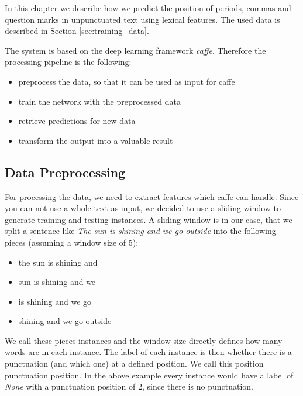 In this chapter we describe how we predict the position of periods, commas and question marks in unpunctuated text using lexical features.
The used data is described in Section \ref{sec:training_data}.


The system is based on the deep learning framework \emph{caffe}.
Therefore the processing pipeline is the following:

\begin{itemize}
\item preprocess the data, so that it can be used as input for caffe
\item train the network with the preprocessed data
\item retrieve predictions for new data
\item transform the output into a valuable result
\end{itemize}

\subsection{Data Preprocessing}

For processing the data, we need to extract features which caffe can handle.
Since you can not use a whole text as input, we decided to use a sliding window to generate training and testing instances.
A sliding window is in our case, that we split a sentence like \emph{The sun is shining and we go outside} into the following pieces (assuming a window size of 5):
\begin{itemize}
\item the sun is shining and
\item sun is shining and we
\item is shining and we go
\item shining and we go outside
\end{itemize}


We call these pieces instances and the window size directly defines how many words are in each instance.
The label of each instance is then whether there is a punctuation (and which one) at a defined position.
We call this position punctuation position.
In the above example every instance would have a label of \emph{None} with a punctuation position of 2, since there is no punctuation.

